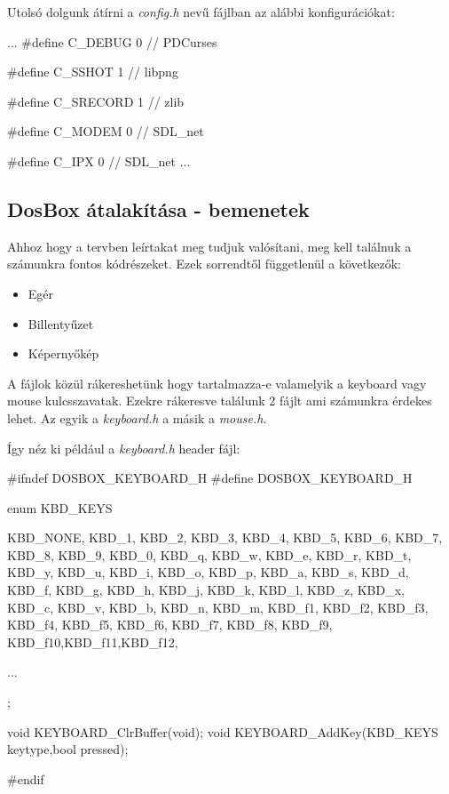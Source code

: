 Utolsó dolgunk átírni a \textit{config.h} nevű fájlban az alábbi konfigurációkat: 

\begin{cpp}

    ...
    #define C_DEBUG 0 // PDCurses

    #define C_SSHOT 1 // libpng

    #define C_SRECORD 1 // zlib

    #define C_MODEM 0 // SDL_net 

    #define C_IPX 0 // SDL_net 
    ...
\end{cpp}

\subsection{DosBox átalakítása - bemenetek}

Ahhoz hogy a tervben leírtakat meg tudjuk valósítani, meg kell találnuk a számunkra fontos kódrészeket. Ezek sorrendtől függetlenül a következők:

\begin{itemize}
    \item Egér 
    \item Billentyűzet
    \item Képernyőkép
\end{itemize}

A fájlok közül rákereshetünk hogy tartalmazza-e valamelyik a keyboard vagy mouse kulcsszavatak. Ezekre rákeresve találunk 2 fájlt ami számunkra érdekes lehet. Az egyik a \textit{keyboard.h} a másik a \textit{mouse.h}.

Így néz ki például a \textit{keyboard.h} header fájl:

\begin{cpp}
    #ifndef DOSBOX_KEYBOARD_H
    #define DOSBOX_KEYBOARD_H
    
    enum KBD_KEYS {
        KBD_NONE,
        KBD_1,	KBD_2,	KBD_3,	KBD_4,	KBD_5,	KBD_6,	KBD_7,	
        KBD_8,	KBD_9,	KBD_0,		
        KBD_q,	KBD_w,	KBD_e,	KBD_r,	KBD_t,	KBD_y,	KBD_u,	
        KBD_i,	KBD_o,	KBD_p,	
        KBD_a,	KBD_s,	KBD_d,	KBD_f,	KBD_g,	KBD_h,	KBD_j,	
        KBD_k,	KBD_l,	KBD_z,
        KBD_x,	KBD_c,	KBD_v,	KBD_b,	KBD_n,	KBD_m,	
        KBD_f1,	KBD_f2,	KBD_f3,	KBD_f4,	KBD_f5,	KBD_f6,	KBD_f7,	
        KBD_f8,	KBD_f9,	KBD_f10,KBD_f11,KBD_f12,

        ...
        
    };
    
    void KEYBOARD_ClrBuffer(void);
    void KEYBOARD_AddKey(KBD_KEYS keytype,bool pressed);
    
    #endif
\end{cpp}

